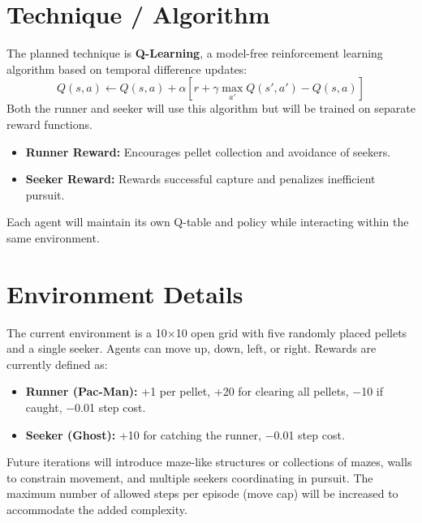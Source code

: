 \documentclass[conference]{IEEEtran}
\begin{document}
\section{Technique / Algorithm}
The planned technique is \textbf{Q-Learning}, a model-free reinforcement learning algorithm based on temporal difference updates:
\begin{equation}
Q(s,a) \leftarrow Q(s,a) + \alpha [r + \gamma \max_{a'} Q(s',a') - Q(s,a)]
\end{equation}
Both the runner and seeker will use this algorithm but will be trained on separate reward functions.  
\begin{itemize}
    \item \textbf{Runner Reward:} Encourages pellet collection and avoidance of seekers.  
    \item \textbf{Seeker Reward:} Rewards successful capture and penalizes inefficient pursuit.  
\end{itemize}
Each agent will maintain its own Q-table and policy while interacting within the same environment.

\section{Environment Details}
The current environment is a 10$\times$10 open grid with five randomly placed pellets and a single seeker. Agents can move up, down, left, or right.  
Rewards are currently defined as:  
\begin{itemize}
    \item \textbf{Runner (Pac-Man):} +1 per pellet, +20 for clearing all pellets, −10 if caught, −0.01 step cost.  
    \item \textbf{Seeker (Ghost):} +10 for catching the runner, −0.01 step cost.  
\end{itemize}
Future iterations will introduce maze-like structures or collections of mazes, walls to constrain movement, and multiple seekers coordinating in pursuit. The maximum number of allowed steps per episode (move cap) will be increased to accommodate the added complexity.
\end{document}
